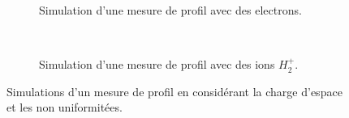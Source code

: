 \begin{figure}[!ht]
	\begin{subfigure}[t]{0.5\textwidth}
		
		\caption[]{Simulation d'une mesure de profil avec des electrons.}
		\label{sumfr:fig:SC_profile_a}
	\end{subfigure}
	~
	\begin{subfigure}[t]{0.5\textwidth}
		
		\caption[]{Simulation d'une mesure de profil avec des ions $H^{+}_{2}$.}
		\label{sumfr:fig:SC_profile_b}
	\end{subfigure}
  \caption[]{Simulations d'un mesure de profil en considérant la charge d'espace et les non uniformitées.}
	\label{sumfr:fig:SC_profile}
\end{figure}
